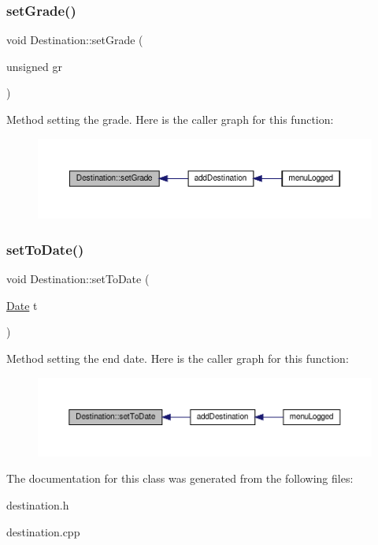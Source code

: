 \subsubsection{\texorpdfstring{set\+Grade()}{setGrade()}}
{\footnotesize\ttfamily void Destination\+::set\+Grade (\begin{DoxyParamCaption}\item[{unsigned}]{gr }\end{DoxyParamCaption})}

Method setting the grade. Here is the caller graph for this function\+:\nopagebreak
\begin{figure}[H]
\begin{center}
\leavevmode
\includegraphics[width=350pt]{class_destination_ac7f1c3be54b5223aa1e9ad4523ef6976_icgraph}
\end{center}
\end{figure}
\mbox{\label{class_destination_afec038764d48882a9005cea50e418219}} 
\subsubsection{\texorpdfstring{set\+To\+Date()}{setToDate()}}
{\footnotesize\ttfamily void Destination\+::set\+To\+Date (\begin{DoxyParamCaption}\item[{\hyperlink{class_date}{Date}}]{t }\end{DoxyParamCaption})}

Method setting the end date. Here is the caller graph for this function\+:\nopagebreak
\begin{figure}[H]
\begin{center}
\leavevmode
\includegraphics[width=350pt]{class_destination_afec038764d48882a9005cea50e418219_icgraph}
\end{center}
\end{figure}


The documentation for this class was generated from the following files\+:\begin{DoxyCompactItemize}
\item 
destination.\+h\item 
destination.\+cpp\end{DoxyCompactItemize}

